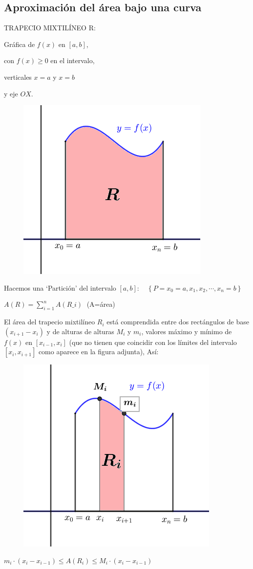 \subsection{Aproximación del área bajo una curva}

\begin{multicols}{2}

TRAPECIO MIXTILÍNEO R:

Gráfica de $f(x)$ en $[a,b]$, 

con $f(x)\ge 0$ en el intervalo,

verticales $x=a$ y $x=b$ 

y eje $OX$.

 	\begin{figure}[H]
		\centering
		\includegraphics[width=.3\textwidth]{imagenes/imagenes08/T08IM01.png}
	\end{figure}
	
\end{multicols}

\begin{multicols}{2}

Hacemos una `Partición' del intervalo  $[a,b]: \quad \left\{ P=  x_0=a, x_1, x_2, \cdots , x_n=b \right\}$

$A(R)=\sum _{ i=1 }^{ n }{ A(R\_ i) } \; $  (A=área)

El área del trapecio mixtilíneo $R_i$ está comprendida entre dos rectángulos de base $(x_{i+1}-x_{i})$ y de alturas de alturas $M_i$ y $m_i$, valores máximo y mínimo de $f(x)$ en $[x_{i-1}, x_i]$ (que no tienen que coincidir con los límites del intervalo $[x_{i}, x_{i+1}]$ como aparece en la figura adjunta), Así:



 	\begin{figure}[H]
		\centering
		\includegraphics[width=.4\textwidth]{imagenes/imagenes08/T08IM02.png}
	\end{figure}
\end{multicols}
$ m_i\cdot (x_i-x_{i-1}) \le A(R_i) \le M_i\cdot (x_i-x_{i-1})$

